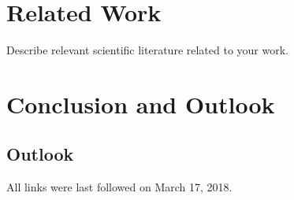 \documentclass[
  a4paper,  %
  twoside,  %
  bibliography=totoc,
  headsepline,
  cleardoublepage=empty,
  parskip=half,
  draft=false
]{scrbook}
\begin{document}


\blinddocument

\chapter{Related Work}

Describe relevant scientific literature related to your work.

\chapter{Conclusion and Outlook}
\label{chap:zusfas}

\section*{Outlook}

\printbibliography

All links were last followed on March 17, 2018.

\appendix


\pagestyle{empty}
\renewcommand*{\chapterpagestyle}{empty}
\Versicherung
\end{document}
